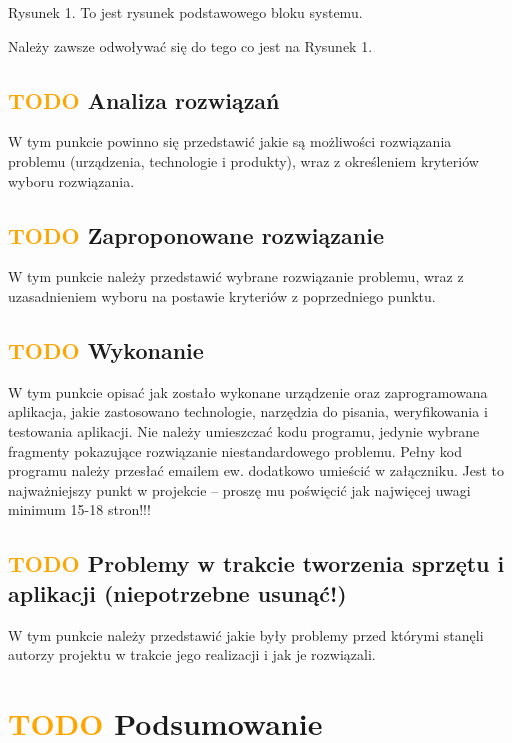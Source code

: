 \documentclass[11pt,titlepage]{article}
\begin{document}
Rysunek 1. To jest rysunek podstawowego bloku systemu.

Należy zawsze odwoływać się do tego co jest na Rysunek 1.

\subsection{\textcolor{orange}{TODO} Analiza rozwiązań}

W tym punkcie powinno się przedstawić jakie są możliwości rozwiązania problemu (urządzenia, technologie i produkty), wraz z określeniem kryteriów wyboru rozwiązania.

\subsection{\textcolor{orange}{TODO} Zaproponowane rozwiązanie}

W tym punkcie należy przedstawić wybrane rozwiązanie problemu, wraz z uzasadnieniem wyboru na postawie kryteriów z poprzedniego punktu.

\subsection{\textcolor{orange}{TODO} Wykonanie}

W tym punkcie opisać jak zostało wykonane urządzenie oraz zaprogramowana aplikacja, jakie zastosowano technologie, narzędzia do pisania, weryfikowania i testowania aplikacji. Nie należy umieszczać kodu programu, jedynie wybrane fragmenty pokazujące rozwiązanie niestandardowego problemu. Pełny kod programu należy przesłać emailem ew. dodatkowo umieścić w załączniku.
Jest to najważniejszy punkt w projekcie – proszę mu poświęcić jak najwięcej uwagi minimum 15-18 stron!!!

\subsection{\textcolor{orange}{TODO} Problemy w trakcie tworzenia sprzętu i aplikacji (niepotrzebne usunąć!)}

W tym punkcie należy przedstawić jakie były problemy przed którymi stanęli autorzy projektu w trakcie jego realizacji i jak je rozwiązali.

\newpage

\section{\textcolor{orange}{TODO} Podsumowanie}
\end{document}
